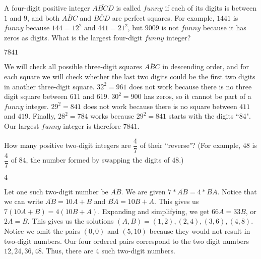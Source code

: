 \documentclass[11pt]{article}
\begin{document}
\begin{problem}
A four-digit positive integer $\overline{ABCD}$ is called $\textit{funny}$ if each of its digits is between $1$ and $9$, and both $\overline{ABC}$ and $\overline{BCD}$ are perfect squares. For example, $1441$ is $\textit{funny}$ because $144 = 12^2$ and $441 = 21^2$, but $9009$ is not $\textit{funny}$ because it has zeros as digits. What is the largest four-digit $\textit{funny}$ integer?
\end{problem}

\begin{answer}
$7841$
\end{answer}

\begin{solution}
We will check all possible three-digit squares $\overline{ABC}$ in descending order, and for each square we will check whether the last two digits could be the first two digits in another three-digit square. $32^2 = 961$ does not work because there is no three digit square between $611$ and $619$. $30^2 = 900$ has zeros, so it cannot be part of a $\textit{funny}$ integer. $29^2 = 841$ does not work because there is no square between $411$ and $419$. Finally, $28^2 = 784$ works because $29^2 = 841$ starts with the digits ``84". Our largest $\textit{funny}$ integer is therefore $\boxed{7841}$.
\end{solution}


\begin{problem}
How many positive two-digit integers are $\dfrac{4}{7}$ of their ``reverse"? (For example, $48$ is $\dfrac{4}{7}$ of $84$, the number formed by swapping the digits of $48$.)
\end{problem}

\begin{answer}
$4$
\end{answer}

\begin{solution}
Let one such two-digit number be $\overline{AB}$. We are given $7*\overline{AB} = 4*\overline{BA}$. Notice that we can write $\overline{AB} = 10A+B$ and $\overline{BA} = 10B + A$. This gives us $7(10A + B) = 4(10B + A)$. Expanding and simplifying, we get $66A = 33B$, or $2A = B$. This gives us the solutions $(A, B) = (1, 2), (2, 4), (3, 6), (4, 8)$. Notice we omit the pairs $(0, 0)$ and $(5, 10)$ because they would not result in two-digit numbers. Our four ordered pairs correspond to the two digit numbers $12, 24, 36, 48$. Thus, there are $\boxed{4}$ such two-digit numbers. 
\end{solution}
\end{document}
